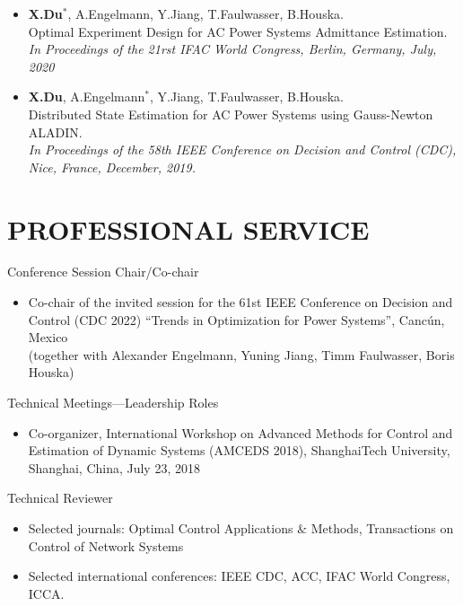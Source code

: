 \documentclass[paper=a4,fontsize=11pt]{scrartcl} %
\newcommand{\NewPart}[1]{\section*{\uppercase{#1}}}
\newcommand{\EducationEntry}[4]{
		\noindent \textbf{#1} \hfill      %
		\colorbox{White}{%
			\parbox{5cm}{%
			\hfill\color{Black}#2}} \par  %
		\noindent \textit{#3} \par        %
		\noindent\hangindent=2em\hangafter=0 \small #4 %
		\normalsize \par}
\begin{document}
\begin{itemize}
		\item [\textbf{C2}] {\textbf{X.Du}$^*$, A.Engelmann, Y.Jiang, T.Faulwasser, B.Houska. \\
		Optimal Experiment Design for AC Power Systems Admittance Estimation.\\
		\emph{In Proceedings of the 21rst IFAC World Congress, Berlin, Germany, July, 2020
		} }
	
	\item [\textbf{C1}] {\textbf{X.Du}, A.Engelmann$^*$, Y.Jiang, T.Faulwasser, B.Houska. \\
		Distributed State Estimation for AC Power Systems using Gauss-Newton ALADIN. \\
		 \emph{In Proceedings of the 58th IEEE Conference on Decision and Control (CDC),
		Nice, France, December, 2019.} }
\end{itemize}

\NewPart{Professional Service}{Conference Session Chair/Co-chair}
%
\begin{itemize}
	\item{Co-chair of the invited session for the 61st
		IEEE Conference on Decision and Control (CDC 2022)
		“Trends in Optimization for Power Systems”, Canc\'un, Mexico}\\
	(together with Alexander Engelmann, Yuning Jiang, Timm Faulwasser, Boris Houska)
	\end{itemize}
{Technical Meetings—Leadership Roles}
\begin{itemize}
\item{Co-organizer, International Workshop on Advanced Methods for Control and Estimation of Dynamic
	Systems (AMCEDS 2018), ShanghaiTech University, Shanghai, China, July 23, 2018}
\end{itemize}
{Technical Reviewer}
\begin{itemize}
	\item Selected journals: Optimal Control Applications $\&$ Methods, Transactions on Control of Network Systems
	
	\item Selected international conferences: IEEE CDC, ACC, IFAC World Congress, ICCA.
\end{itemize}
\end{document}
